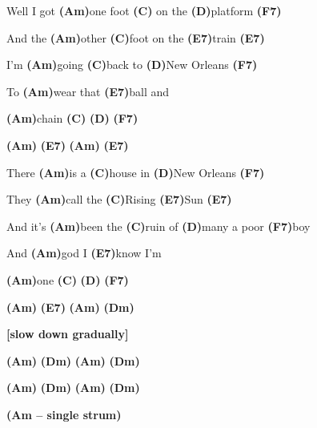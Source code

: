 \documentclass{article}
\newenvironment{song}{%
	\pagebreak%
	\parindent0pt%
    \Large%
}{%
}%
\newcommand{\ch}[1]{\textbf{(#1)}}
\newcommand{\note}[1]{\textbf{[#1]}}
\begin{document}
\begin{song}
\bigskip

Well I got \ch{Am}one foot \ch{C} on the \ch{D}platform \ch{F7} \par
And the \ch{Am}other \ch{C}foot on the \ch{E7}train \ch{E7} \par
I’m \ch{Am}going \ch{C}back to \ch{D}New Orleans \ch{F7} \par
To \ch{Am}wear that \ch{E7}ball and \par
\ch{Am}chain \ch{C} \ch{D} \ch{F7} \par
\ch{Am} \ch{E7} \ch{Am} \ch{E7} \par

\bigskip

There \ch{Am}is a \ch{C}house in \ch{D}New Orleans \ch{F7} \par
They \ch{Am}call the \ch{C}Rising \ch{E7}Sun \ch{E7} \par
And it’s \ch{Am}been the \ch{C}ruin of \ch{D}many a poor \ch{F7}boy \par
And \ch{Am}god I \ch{E7}know I’m \par
\ch{Am}one \ch{C} \ch{D} \ch{F7} \par
\ch{Am} \ch{E7} \ch{Am} \ch{Dm} \par
\note{slow down gradually} \par
\ch{Am} \ch{Dm} \ch{Am} \ch{Dm} \par
\ch{Am} \ch{Dm} \ch{Am} \ch{Dm} \par
\ch{Am – single strum} \par

\end{song}
\end{document}
